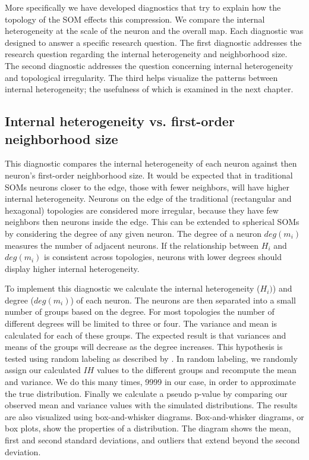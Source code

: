 More specifically we have developed diagnostics that try to explain how the
topology of the SOM effects this compression.  We compare the internal
heterogeneity at the scale of the neuron and the overall map.  Each diagnostic
was designed to answer a specific research question.  The first diagnostic
addresses the research question regarding the internal heterogeneity and
neighborhood size.  The second diagnostic addresses the question concerning
internal heterogeneity and topological irregularity.  The third helps
visualize the patterns between internal heterogeneity; the usefulness of which
is examined in the next chapter.

\subsection{Internal heterogeneity vs. first-order neighborhood size}
\label{q1}
This diagnostic compares the internal heterogeneity of each neuron against
then neuron's first-order neighborhood size.  It would be expected that in
traditional SOMs neurons closer to the edge, those with fewer neighbors, will
have higher internal heterogeneity. Neurons on the edge of the traditional
(rectangular and hexagonal) topologies are considered more irregular, because
they have few neighbors then neurons inside the edge.  This can be extended to
spherical SOMs by considering the degree of any given neuron.  The degree of a
neuron $deg(m_i)$ measures the number of adjacent neurons.  If the
relationship between $H_i$ and $deg(m_i)$ is consistent across topologies,
neurons with lower degrees should display higher internal heterogeneity.

To implement this diagnostic we calculate the internal heterogeneity ($H_i)$)
and degree ($deg(m_i)$) of each neuron. The neurons are then separated into a small number of
groups based on the degree.  For most topologies the number of
different degrees will be limited to three or four.  The variance and mean
is calculated for each of these groups.  The expected result is that
variances and means of the groups will decrease as the degree increases.  This
hypothesis is tested using random labeling as described by \cite{siss2004}.
In random labeling, we randomly assign our calculated $IH$ values to the
different groups and recompute the mean and variance.  We do this many times,
9999 in our case, in order to approximate the true distribution. Finally we
calculate a pseudo p-value by comparing our observed mean and variance values
with the simulated distributions.  The results are also visualized using
box-and-whisker diagrams. Box-and-whisker diagrams, or box plots, show the
properties of a distribution.  The diagram shows the mean, first and second
standard deviations, and outliers that extend beyond the second deviation.

